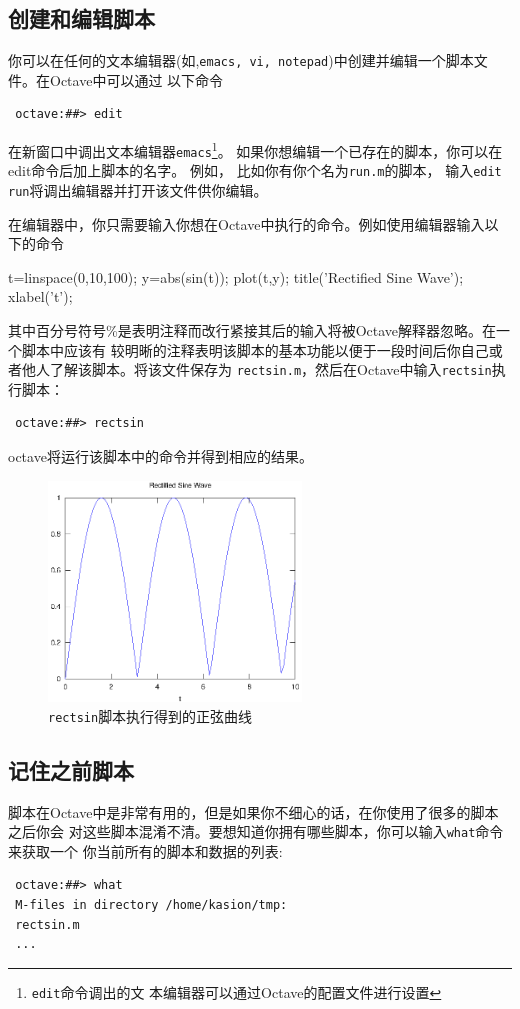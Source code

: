 \documentclass[UTF8,adobefonts]{ctexart}
\begin{document}
\subsection{创建和编辑脚本}
你可以在任何的文本编辑器(如,{\tt emacs, vi, notepad})中创建并编辑一个脚本文件。在Octave中可以通过
以下命令
\begin{verbatim}
 octave:##> edit
\end{verbatim}
在新窗口中调出文本编辑器{\tt emacs}\footnote{{\tt edit}命令调出的文
本编辑器可以通过Octave的配置文件进行设置}。
如果你想编辑一个已存在的脚本，你可以在edit命令后加上脚本的名字。 例如，
比如你有你个名为{\tt run.m}的脚本，
输入{\tt edit run}将调出编辑器并打开该文件供你编辑。

在编辑器中，你只需要输入你想在Octave中执行的命令。例如使用编辑器输入以下的命令
\begin{verbatim*}
 t=linspace(0,10,100);
 y=abs(sin(t)); %
 plot(t,y);
 title('Rectified Sine Wave');
 xlabel('t');
\end{verbatim*}
其中百分号符号\%是表明注释而改行紧接其后的输入将被Octave解释器忽略。在一个脚本中应该有
较明晰的注释表明该脚本的基本功能以便于一段时间后你自己或者他人了解该脚本。将该文件保存为
{\tt rectsin.m}，然后在Octave中输入{\tt rectsin}执行脚本：
\begin{verbatim}
 octave:##> rectsin
\end{verbatim}
octave将运行该脚本中的命令并得到相应的结果。
\begin{figure}
\centering
\includegraphics[width=0.6\textwidth]{rectsin.eps}
\caption{{\tt rectsin}脚本执行得到的正弦曲线}
\end{figure}
\subsection{记住之前脚本}
脚本在Octave中是非常有用的，但是如果你不细心的话，在你使用了很多的脚本之后你会
对这些脚本混淆不清。要想知道你拥有哪些脚本，你可以输入{\tt what}命令来获取一个
你当前所有的脚本和数据的列表:
\begin{verbatim}
 octave:##> what
 M-files in directory /home/kasion/tmp:
 rectsin.m
 ...
\end{verbatim}
\end{document}
